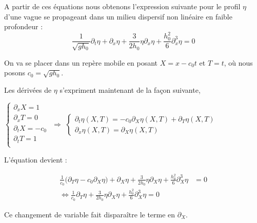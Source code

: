 A partir de ces équations nous obtenons l'expression suivante pour le profil $\eta$ d'une vague se propageant dans un milieu dispersif non linéaire en faible profondeur : 
$$\frac{1}{\sqrt{gh_0}}\partial_t \eta + \partial_x \eta + \frac{3}{2h_0}\eta \partial_x \eta + \frac{h_0^2}{6} \partial_x^3 \eta = 0$$

On va se placer dans un repère mobile en posant $X = x - c_0t$ et $T = t$, où nous posons $c_0 = \sqrt{gh_0}$.

Les dérivées de $\eta$ s'expriment maintenant de la façon suivante,

$\begin{cases}
     \partial_xX = 1 \\
     \partial_x T = 0 \\
     \partial_t X = -c_0 \\
     \partial_t T = 1 \\
\end{cases}$ $\Rightarrow$
$\begin{cases}
    \partial_t \eta(X,T) = -c_0\partial_X \eta(X,T) + \partial_T \eta(X,T) \\
    \partial_x \eta(X,T) = \partial_X \eta(X,T)
\end{cases}$

L'équation devient : 

\begin{equation*}
\begin{split}
    \frac{1}{c_0}\Big(\partial_T \eta - c_0 \partial_X \eta \Big) + \partial_X \eta + \frac{3}{2h_0}\eta \partial_X \eta + \frac{h_0^2}{6}\partial_X^3 \eta &= 0 \\
    \Leftrightarrow \frac{1}{c_0}\partial_T \eta + \frac{3}{2h_0} \eta \partial_X \eta + \frac{h_0^2}{6} \partial_X^3 \eta = 0
\end{split}
\end{equation*}

Ce changement de variable fait disparaître le terme en $\partial_X$. 

